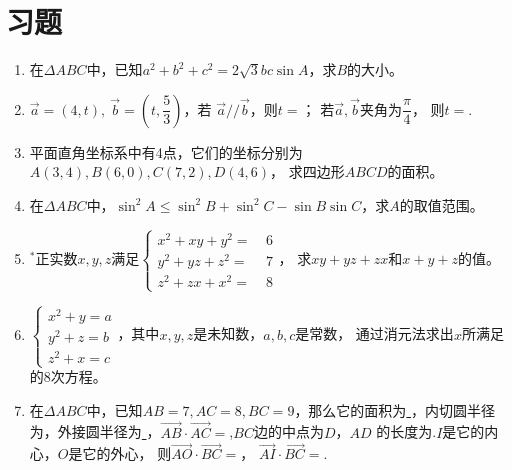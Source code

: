 \section{习题}
\begin{enumerate}[label={\textbf{\arabic*.}},leftmargin=
    \inteval{\myenumleftmargin}pt]
\item 在$ \Delta ABC $中，已知$ a^2+b^2+c^2=2\sqrt{3}bc\sin A $，求$ B $的大小。

\item $ \vec{a}=(4,t),\ \vec{b}=\left(t,\dfrac{5}{3}\right) $，若
$ \vec{a}//\vec{b} $，则$ t= $\underline{\hspace{2cm}}；
若$ \vec{a},\vec{b} $夹角为$ \dfrac{\pi}{4} $，
则$ t= $\underline{\hspace{2cm}}.

\item 平面直角坐标系中有4点，它们的坐标分别为$ A(3,4),B(6,0),C(7,2),D(4,6) $，
求四边形$ ABCD $的面积。

\item 在$ \Delta ABC $中，$ \sin^2A\leq\sin^2B+\sin^2C-
\sin B\sin C $，求$ A $的取值范围。

\item $ ^* $正实数$ x,y,z $满足$ \begin{cases} x^2+xy+y^2 =&\ 6 \\
    y^2+yz+z^2=&\ 7  \\
    z^2+zx+x^2=&\ 8  \end{cases} $，
求$ xy+yz+zx $和$ x+y+z $的值。

\item 
$\begin{cases}
    x^2+y=a \\
    y^2+z=b \\
    z^2+x=c 
\end{cases}$，其中$x,y,z$是未知数，$a,b,c$是常数，
通过消元法求出$x$所满足的8次方程。

\item 在$ \Delta ABC $中，已知$ AB=7,AC=8,BC=9 $，那么它的面积为\underline{
    \hspace{1cm}}，内切圆半径为\underline{\hspace{1cm}}，外接圆半径为\underline{
    \hspace{1cm}}，$ \vec{AB}\cdot \vec{AC}
=$\underline{\hspace{1cm}},$ BC $边的中点为$ D $，$ AD $
的长度为\underline{\hspace{1cm}}.$ I $是它的内心，$ O $是它的外心，
则$ \vec{AO}\cdot\vec{BC} = $\underline{\hspace{2cm}}，
$ \vec{AI}\cdot\vec{BC}= $\underline{\hspace{2cm}}.


\end{enumerate}
